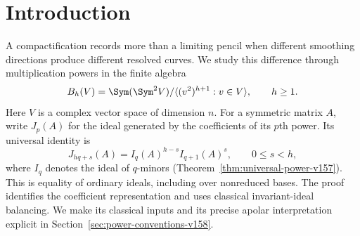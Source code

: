 \begin{abstract}
Multiplication in a determinant-apolar algebra realizes balanced
products of symmetric minor ideals over every complex base algebra.
Its all-rank power graphs recover relative complete quadrics, and
power contacts together with finite syzygy maps recover the complete
data of arbitrary symmetric pencils. We identify the normalized
Hilbert incidence space, on the simple corank-two open in every
dimension, with the blow-up of a smooth codimension-two centre.
This determines the whole exceptional projective line, its nodal
universal family, its discrepancy, and all multiplication systems,
including residual directions tangent to the determinant conic.
The centre and its Rees algebra are intrinsic multiplication data
of the sharp failure family. For simultaneous ordinary collisions
of arbitrary multiplicities we retain the full nodal-tree calculation,
its exact power ideals and its residual-pencil moduli.
\end{abstract}
\maketitle
\section{Introduction}
\label{sec:paper-ii-v159}
A compactification records more than a limiting pencil when different
smoothing directions produce different resolved curves. We study this
difference through multiplication powers in the finite algebra
\[
 B_h(V)=\Sym(\Sym^2V)/\langle(v^2)^{h+1}:v\in V\rangle,
 \qquad h\geq1.
\]
Here $V$ is a complex vector space of dimension $n$. For a symmetric
matrix $A$, write $J_p(A)$ for the ideal generated by the coefficients
of its $p$th power. Its universal identity is
\[
 J_{hq+s}(A)=I_q(A)^{h-s}I_{q+1}(A)^s,\qquad 0\leq s<h,
\]
where $I_q$ denotes the ideal of $q$-minors
(Theorem~\ref{thm:universal-power-v157}). This is equality of ordinary
ideals, including over nonreduced bases. The proof identifies the
coefficient representation and uses classical invariant-ideal
balancing. We make its classical inputs and its precise apolar
interpretation explicit in Section~\ref{sec:power-conventions-v158}.


